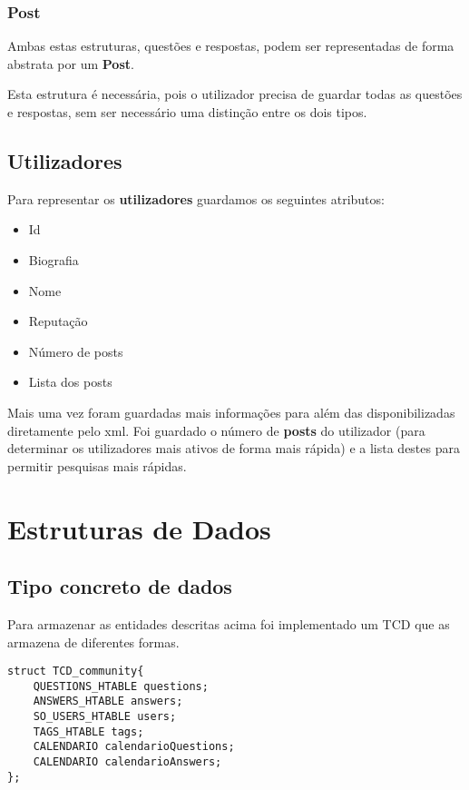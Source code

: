 \documentclass[10pt,a4paper]{article}
\begin{document}
        \subsubsection{Post}
        Ambas estas estruturas, questões e respostas, podem ser representadas de
        forma abstrata por um \textbf{Post}.

        Esta estrutura é necessária, pois o utilizador precisa de guardar
        todas as questões e respostas, sem ser necessário uma distinção entre 
        os dois tipos.
        
    \subsection{Utilizadores}
    Para representar os \textbf{utilizadores} guardamos os seguintes atributos:
    \begin{multicols}{3}
    \begin{itemize}
            \item Id
            \item Biografia
            \item Nome
            \item Reputação
            \item Número de posts
            \item Lista dos posts
    \end{itemize}
    \end{multicols}
    Mais uma vez foram guardadas mais informações para além das disponibilizadas
    diretamente pelo xml. Foi guardado o número de \textbf{posts} do utilizador
    (para determinar os utilizadores mais ativos de forma mais rápida) e a lista 
    destes para permitir pesquisas mais rápidas.

\section{Estruturas de Dados}
    \subsection{Tipo concreto de dados}
    Para armazenar as entidades descritas acima foi implementado um TCD que
    as armazena de diferentes formas.
    \begin{verbatim}
struct TCD_community{
    QUESTIONS_HTABLE questions;
    ANSWERS_HTABLE answers;
    SO_USERS_HTABLE users;
    TAGS_HTABLE tags;
    CALENDARIO calendarioQuestions;
    CALENDARIO calendarioAnswers;
};
    \end{verbatim}
\end{document}
